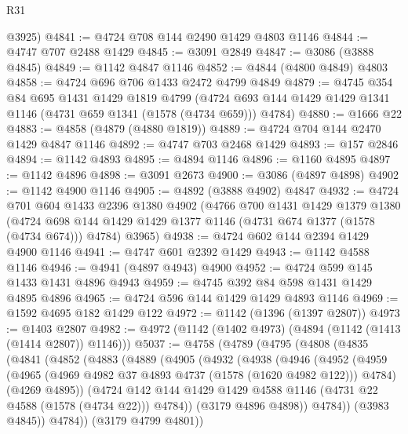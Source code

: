 \begin{lexlean}{R31}
\begin{coremodule}
      @3925)
@4841 := @4724 @708 @144 @2490 @1429 @4803 @1146
@4844 := @4747 @707 @2488 @1429
@4845 := @3091 @2849
@4847 := @3086 (@3888 @4845)
@4849 := @1142 @4847 @1146
@4852 := @4844 (@4800 @4849) @4803
@4858 := @4724 @696 @706 @1433 @2472 @4799 @4849
@4879 := @4745
    @354
    @84
    @695
    @1431
    @1429
    @1819
    @4799
    (@4724 @693 @144 @1429 @1429 @1341 @1146 (@4731 @659 @1341 (@1578 (@4734 @659))) @4784)
@4880 := @1666 @22
@4883 := @4858 (@4879 (@4880 @1819))
@4889 := @4724 @704 @144 @2470 @1429 @4847 @1146
@4892 := @4747 @703 @2468 @1429
@4893 := @157 @2846
@4894 := @1142 @4893
@4895 := @4894 @1146
@4896 := @1160 @4895
@4897 := @1142 @4896
@4898 := @3091 @2673
@4900 := @3086 (@4897 @4898)
@4902 := @1142 @4900 @1146
@4905 := @4892 (@3888 @4902) @4847
@4932 := @4724
    @701
    @604
    @1433
    @2396
    @1380
    @4902
    (@4766
      @700
      @1431
      @1429
      @1379
      @1380
      (@4724 @698 @144 @1429 @1429 @1377 @1146 (@4731 @674 @1377 (@1578 (@4734 @674))) @4784)
      @3965)
@4938 := @4724 @602 @144 @2394 @1429 @4900 @1146
@4941 := @4747 @601 @2392 @1429
@4943 := @1142 @4588 @1146
@4946 := @4941 (@4897 @4943) @4900
@4952 := @4724 @599 @145 @1433 @1431 @4896 @4943
@4959 := @4745 @392 @84 @598 @1431 @1429 @4895 @4896
@4965 := @4724 @596 @144 @1429 @1429 @4893 @1146
@4969 := @1592 @4695 @182 @1429 @122
@4972 := @1142 (@1396 (@1397 @2807))
@4973 := @1403 @2807
@4982 := @4972 (@1142 (@1402 @4973) (@4894 (@1142 (@1413 (@1414 @2807)) @1146)))
@5037 := @4758
    (@4789
      (@4795
        (@4808
          (@4835
            (@4841
              (@4852
                (@4883
                  (@4889
                    (@4905
                      (@4932
                        (@4938
                          (@4946
                            (@4952
                              (@4959
                                (@4965
                                  (@4969 @4982 @37 @4893 @4737 (@1578 (@1620 @4982 @122)))
                                  @4784)
                                (@4269 @4895))
                              (@4724
                                @142
                                @144
                                @1429
                                @1429
                                @4588
                                @1146
                                (@4731 @22 @4588 (@1578 (@4734 @22)))
                                @4784))
                            (@3179 @4896 @4898))
                          @4784))
                      (@3983 @4845))
                    @4784))
                (@3179 @4799 @4801))

\end{coremodule}
\end{lexlean}
